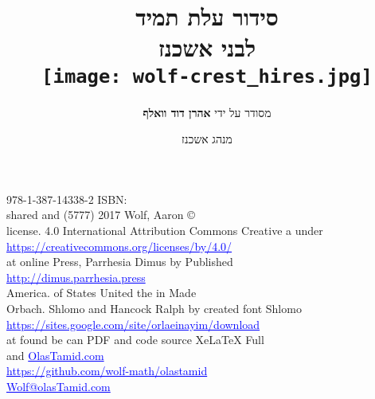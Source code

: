 \documentclass[twoside, openany, parskip=half, 11pt]{book}
\begin{document}
\newcommand{\shatz}{\instruction{ש"ץ: }}
\newcommand{\chazzan}{\instruction{חזן: }}
\newcommand{\kahal}{\instruction{קהל: }}
\newcommand{\shatzvkahal}{\instruction{קהל וש"ץ: }}
\newcommand{\vshatzkahal}{\instruction{וש"ץ: קהל }} %
\newcommand{\chazzanvkahal}{\instruction{חזן וקהל: }}
\newcommand{\vkahalchazzan}{\instruction{וקהל: חזן }} %


\title{  סידור עלת תמיד \\
לבני אשכנז\\
\vspace{.5in}
\texttt{[image: wolf-crest\_hires.jpg]}
 }

\author{מסודר על ידי 
\textbf{אהרן דוד וואלף}}
\date{מנהג אשכנז}

\maketitle

978-1-387-14338-2 ISBN:\\

shared and (5777) 2017 Wolf, Aaron ©\\
license. 4.0 International Attribution Commons Creative a under\\ 
\textcolor{blue}{\underline{https://creativecommons.org/licenses/by/4.0/}}\\

at online Press, Parrhesia Dimus by Published\\ \textcolor{blue}{\underline{http://dimus.parrhesia.press}}\\
America. of States United the in Made\\

Orbach. Shlomo and Hancock Ralph by created font Shlomo\\
\textcolor{blue}{\underline{https://sites.google.com/site/orlaeinayim/download}}\\

at found be can PDF and code source XeLaTeX Full\\
and \textcolor{blue}{\underline{OlasTamid.com}} \\
  \textcolor{blue}{\underline{https://github.com/wolf-math/olastamid}}\\

\textcolor{blue}{\underline{Wolf@olasTamid.com}}

\clearpage

\end{document}
